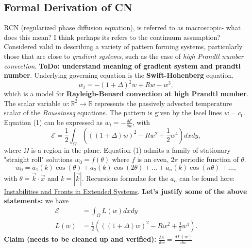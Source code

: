 \documentclass[12pt]{article}
\newcounter{solution}
\begin{document}
\subsection{Formal Derivation of CN}
\hspace*{10mm} RCN (regularized phase diffusion equation), is referred to as macroscopic- what does this mean? I think perhaps its refers to the continuum assumption? Considered valid in describing a variety of pattern forming systems, particularly those that are close to \emph{gradient systems}, such as the case of \emph{high Prandtl number convection}. \textbf{ToDo: understand meaning of gradient system and prandtl number}. Underlying governing equation is the \textbf{Swift-Hohenberg} equation,
\begin{equation}
    w_t = -(1+\Delta)^2w + Rw - w^3,
\end{equation}
which is a model for \textbf{Rayleigh-Benard convection at high Prandtl number}. The scalar variable $w: \mathbb{R}^2 \rightarrow \mathbb{R}$ represents the passively advected temperature scalar of the \emph{Boussinesq} equations. The pattern is given by the lecel lines $w = c_0$.
Equation (1) can be expressed as $w_t = -\frac{\delta \mathcal{E}}{\delta w}$, with
\begin{equation}
    \mathcal{E} = \frac{1}{2}\int_{\Omega}\left(((1+\Delta)w)^2-Rw^2+\frac{1}{2}w^4\right)dxdy,
\end{equation}
where $\Omega$ is a region in the plane. 
Equation (1) admits a family of stationary "straight roll" solutions $w_0 = f(\theta)$ where $f$ is an even, $2\pi$ periodic function of $\theta$.
\begin{equation}
    w_0 = a_1(k)\cos(\theta)+a_2(k)\cos(2\theta)+\dots+a_n(k)\cos(n\theta)+\dots,
\end{equation}
with $\theta = \vec{k}\cdot\vec{x}$ and $k=|\vec{k}|$. Recursions formulae for the $a_n$ can be found here: \href{https://ebookcentral.proquest.com/lib/uaz/reader.action?docID=3031012}{Instabilities and Fronts in Extended Systems}. \newline
\hspace*{10mm} \textbf{Let's justify some of the above statements:} we have
\begin{align*}
    \mathcal{E} &= \int_{\Omega}L(w)dxdy\\
    L(w) &= \frac{1}{2}\left( ((1+\Delta)w)^2-Rw^2+\frac{1}{2}w^4 \right).
\end{align*}
\textbf{Claim (needs to be cleaned up and verified):} $\frac{\delta \mathcal{E}}{\delta w} = \frac{dL(w)}{dw}$
\end{document}
